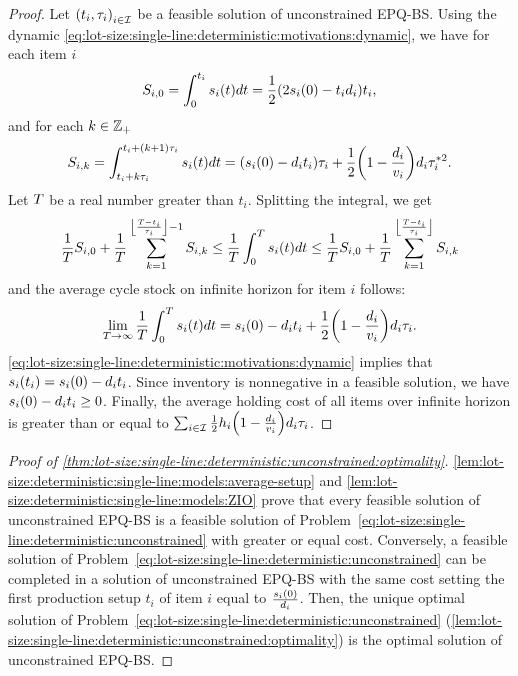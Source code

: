 \begin{proof}
Let $\bracket{t_i,\cover_i}_{i\in\REF}$ be a feasible solution of unconstrained EPQ-BS.
Using the dynamic \eqref{eq:lot-size:single-line:deterministic:motivations:dynamic}, we have for each item $i$
\begin{equation}
  S_{i,0}
  =
  \int_0^{t_i}\inventory_i\bracket{t}dt
  = \frac{1}{2}\bracket{2\inventory_i\bracket{0}-t_i\demand_i}t_i,
\end{equation}
and for each $k\in\mathbb{Z}_+$
\begin{equation}
  S_{i,k}
  =
  \int_{t_i+k\cover_i}^{t_i+\bracket{k+1}\cover_i}\inventory_i(t)dt
  =
  \bracket{\inventory_i(0)-\demand_i t_i}\cover_i
  + \frac{1}{2}\bracket{1-\frac{\demand_i}{\rate_i}}\demand_i\cover_i^{*2}.
\end{equation}
Let $T$ be a real number greater than $t_i$.
Splitting the integral, we get
\begin{equation}
  \frac{1}{\horizon} S_{i,0}
  + \frac{1}{\horizon} \sum_{k=1}^{\left\lfloor\frac{\horizon-t_i}{\cover_i}\right\rfloor-1} S_{i,k}
  \le
  \frac{1}{\horizon} \int_0^{\horizon}\inventory_i\bracket{t}dt
  \le
  \frac{1}{\horizon} S_{i,0}
  + \frac{1}{\horizon} \sum_{k=1}^{\left\lfloor\frac{\horizon-t_i}{\cover_i}\right\rfloor} S_{i,k}
\end{equation}
and the average cycle stock on infinite horizon for item $i$ follows:
\begin{equation}
  \lim_{\horizon\rightarrow\infty} \frac{1}{\horizon} \int_0^{\horizon}\inventory_i\bracket{t}dt
  =
  \inventory_i(0)-\demand_i t_i
  + \frac{1}{2}\bracket{1-\frac{\demand_i}{\rate_i}}\demand_i\cover_i.
\end{equation}
\cref{eq:lot-size:single-line:deterministic:motivations:dynamic} implies that $\inventory_i\bracket{t_i}=\inventory_i(0)-\demand_i t_i$.
Since inventory is nonnegative in a feasible solution, we have $s_i(0)-d_i t_i\ge0$.
Finally, the average holding cost of all items over infinite horizon is greater than or equal to
$\sum_{i\in\REF}\frac{1}{2}\holding_i\bracket{1-\frac{\demand_i}{\rate_i}}\demand_i\cover_i$.
\end{proof}


\begin{proof}[Proof of \cref{thm:lot-size:single-line:deterministic:unconstrained:optimality}]
\cref{lem:lot-size:deterministic:single-line:models:average-setup} and \cref{lem:lot-size:deterministic:single-line:models:ZIO} prove that every feasible solution of unconstrained EPQ-BS is a feasible solution of Problem~\eqref{eq:lot-size:single-line:deterministic:unconstrained} with greater or equal cost.
Conversely, a feasible solution of Problem~\eqref{eq:lot-size:single-line:deterministic:unconstrained} can be completed in a solution of unconstrained EPQ-BS with the same cost setting the first production setup $t_i$ of item $i$ equal to $\frac{s_i(0)}{d_i}$.
Then, the unique optimal solution of Problem~\eqref{eq:lot-size:single-line:deterministic:unconstrained} (\cref{lem:lot-size:single-line:deterministic:unconstrained:optimality}) is the optimal solution of unconstrained EPQ-BS.
\end{proof}


